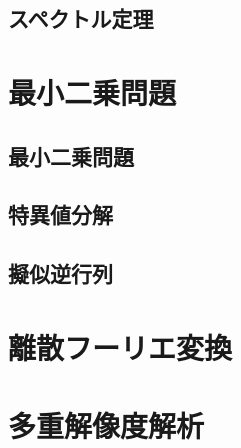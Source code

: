 \documentclass[../../main]{subfiles}
\begin{document}
\subsection{スペクトル定理}

\section{最小二乗問題}
\subsection{最小二乗問題}
\subsection{特異値分解}
\subsection{擬似逆行列}

\section{離散フーリエ変換}

\section{多重解像度解析}
\end{document}
